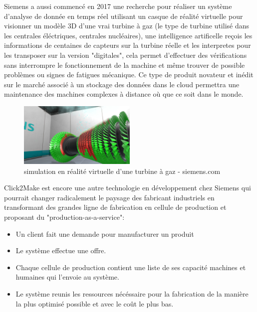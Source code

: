 Siemens a aussi commencé en 2017 une recherche pour réaliser un système d'analyse 
de donnée en temps réel utilisant un casque de réalité virtuelle pour visionner 
un modèle 3D d'une vrai turbine à gaz (le type de turbine utilisé dans les 
centrales éléctriques, centrales nucléaires), une intelligence artificelle reçois les 
informations de centaines de capteurs sur la turbine réelle et les interpretes
pour les transposer sur la version "digitales", cela permet d'effectuer
des vérifications sans interrompre le fonctionnement de la machine 
et même trouver de possible problèmes ou signes de fatigues mécanique. \newline
Ce type de produit novateur et inédit sur le marché associé à 
un stockage des données dans le cloud permettra une maintenance 
des machines complexes à distance où que ce soit dans le monde. \newline 

\begin{figure}[H]
    \centering
    \includegraphics[width=0.5\textwidth]{Images/turbine}
    \caption{simulation en réalité virtuelle d'une turbine à gaz - siemens.com}
	\label{fig:gasturbine}
\end{figure}


Click2Make est encore une autre technologie en développement chez Siemens 
qui pourrait changer radicalement le paysage des fabricant industriels
en transformant des grandes ligne de fabrication en cellule de production 
et proposant du "production-as-a-service": \newline
\begin{itemize}
    \item Un client fait une demande pour manufacturer un produit
    \item Le système effectue une offre.
    \item Chaque cellule de production contient une liste de ses capacité machines et 
    humaines qui l'envoie au système.
    \item Le système reunis les ressources nécéssaire pour la fabrication de la manière
    la plus optimisé possible et avec le coût le plus bas. \newline
\end{itemize}


